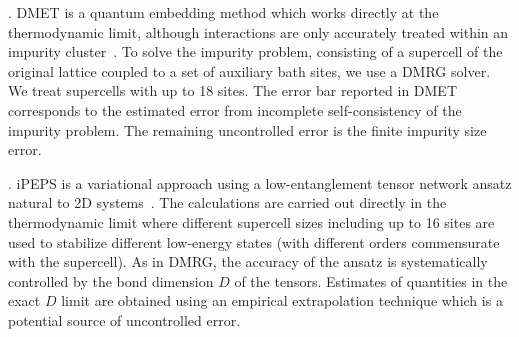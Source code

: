 \documentclass[12pt]{article}
\begin{document}
. DMET is a quantum embedding method which 
works directly at the thermodynamic limit, although interactions are only accurately treated within 
an impurity cluster~\cite{knizia2012density}. To solve the impurity problem, consisting of 
a supercell of the original lattice coupled to a set of auxiliary bath sites, we
use a DMRG solver. We treat supercells with up to 18 sites. The error bar reported in DMET 
corresponds to the estimated error from incomplete self-consistency of the impurity problem. 
The remaining uncontrolled error is the finite impurity size error.


. 
iPEPS is a
variational approach using a low-entanglement tensor network ansatz
natural to 2D
systems~\cite{verstraete2004,nishio2004,jordan2008classical}.  The
calculations are carried out directly in the thermodynamic limit where
different supercell sizes including up to 16 sites are used to stabilize
different low-energy states (with different orders commensurate with the supercell). As in DMRG, the accuracy of the ansatz is
systematically controlled by the bond dimension $D$ of the
tensors. Estimates of quantities in the exact $D$ limit are obtained
using an empirical extrapolation technique which is a potential source
of uncontrolled error.


\end{document}
